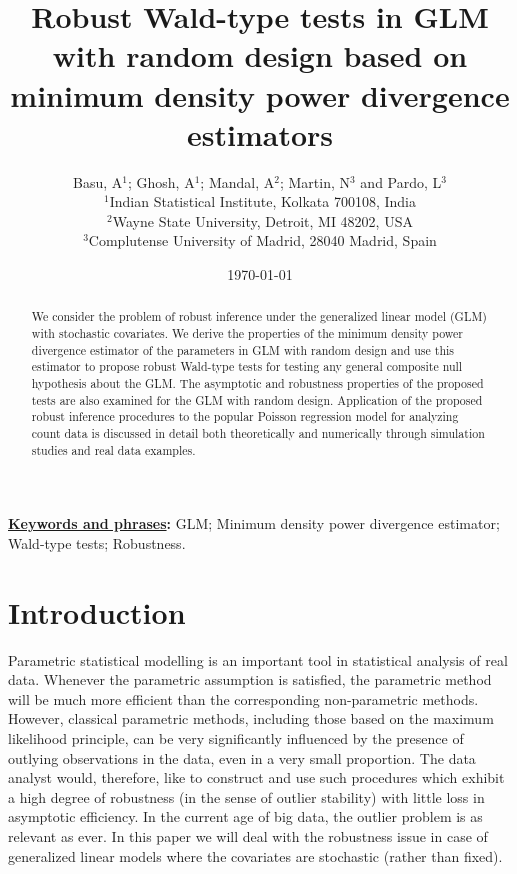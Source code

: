 \documentclass[a4paper]{article}%
\begin{document}
\title{\textbf{Robust Wald-type tests in GLM with random design based on
minimum density power divergence estimators}}
\author{Basu, A$^1$; Ghosh, A$^1$; Mandal, A$^2$; Martin, N$^3$ and Pardo, L$^3$\\
$^1$Indian Statistical Institute, Kolkata 700108, India\\
$^2$Wayne State University, Detroit, MI 48202, USA\\
$^3$Complutense University of Madrid, 28040 Madrid, Spain}
\date{\today}
\maketitle

\begin{abstract}
We consider the problem of robust inference under the  generalized
linear model (GLM) with stochastic covariates. We derive the properties of the
minimum density power divergence estimator of the parameters in GLM with
random design and use this estimator to propose robust Wald-type tests for
testing any general composite null hypothesis about the GLM. The asymptotic and
robustness properties of the proposed tests are also examined for the GLM with
random design. Application of the proposed robust inference procedures to the
popular Poisson regression model for analyzing count data is discussed
in detail both theoretically and numerically through simulation studies and real data examples. 
\end{abstract}

\bigskip\bigskip


\noindent\underline{\textbf{Keywords and phrases}}\textbf{:} GLM; Minimum density power divergence estimator; Wald-type tests; Robustness.

\section{Introduction\label{sec1}}


Parametric statistical modelling is an important tool in statistical analysis of real data. 
Whenever the parametric assumption is satisfied, the parametric method will be much more efficient than the corresponding non-parametric methods. 
However, classical parametric methods, including those based on the maximum likelihood principle, 
can be very significantly influenced by the presence of outlying observations in the data, even in a very small proportion. 
The data analyst would, therefore, like to construct and use such procedures which exhibit a high degree of robustness 
(in the sense of outlier stability) with little loss in asymptotic efficiency. 
In the current age of big data, the outlier problem is as relevant as ever. 
In this paper we will deal with the robustness issue in case of generalized linear models where the covariates are stochastic (rather than fixed). 
\end{document}
